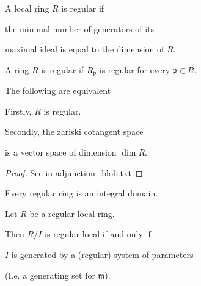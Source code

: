 \begin{definition}

  \label{def:reg_loc}

  A local ring $R$ is regular if 

  the minimal number of generators of its

  maximal ideal is equal to the dimension of $R$.

\end{definition}



\begin{definition}

  \label{def:reg_ring}

  A ring $R$ is regular if 
  $R_\mathfrak{p}$ is regular
  for every $\mathfrak{p} \in R$.
\end{definition}



\begin{proposition}

  \label{prop:reg_def_equiv}


  The following are equivalent

  Firstly, $R$ is regular.

  Secondly, the zariski cotangent space

  is a vector space of dimension $\dim R$.

\end{proposition}



\begin{proof}

  See in adjunction_blob.txt

\end{proof}



\begin{lemma}

  \label{lem:reg_int_dom}


  Every regular ring is an integral domain.

\end{lemma}



\begin{proposition}[BH 2.2.4]

  \label{prop:reg_quot_sys_param}

  Let $R$ be a regular local ring. 

  Then $R / I$ is regular local if and only if 

  $I$ is generated by a (regular) system of parameters

  (I.e. a generating set for $\mathfrak{m}$).

\end{proposition}


